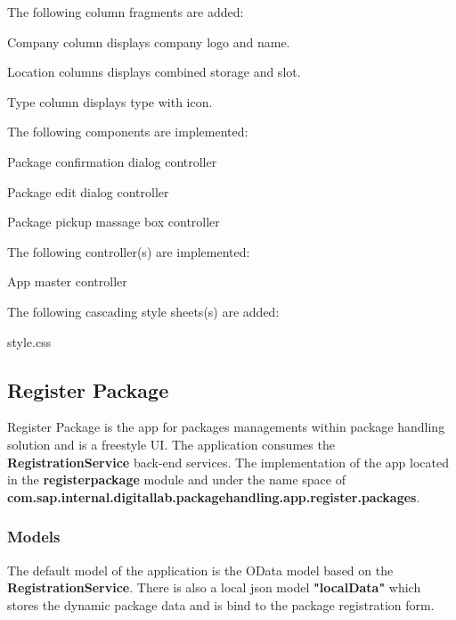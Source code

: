 \bigskip
The following column fragments are added:
\begin{compactenum}
    \item Company column displays company logo and name.
    \item Location columns displays combined storage and slot.
    \item Type column displays type with icon.
\end{compactenum}

\bigskip
The following components are implemented:
\begin{compactenum}
    \item Package confirmation dialog controller
    \item Package edit dialog controller
    \item Package pickup massage box controller
\end{compactenum}

\bigskip
The following controller(s) are implemented:
\begin{compactenum}
    \item App master controller
\end{compactenum}

\bigskip
The following cascading style sheets(s) are added:
\begin{compactenum}
    \item style.css
\end{compactenum}


\subsection{Register Package}

Register Package is the app for packages managements within package handling solution and is a freestyle UI.
The application consumes the \textbf{RegistrationService} back-end services.
The implementation of the app
located in the \textbf{registerpackage} module and under the name space of
\textbf{com.sap.internal.digitallab.packagehandling.app.register.packages}.

\subsubsection{Models}
The default model of the application is the OData model based on the \textbf{RegistrationService}. There is also a local json model \textbf{"localData"} which stores the dynamic package data and is bind to the package registration form.

